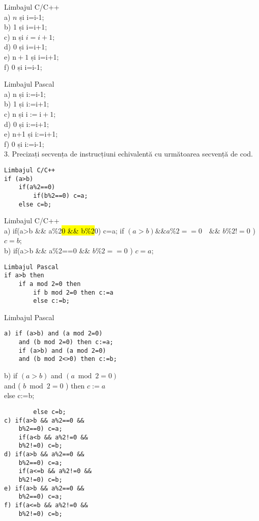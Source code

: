Limbajul C/C++\\
a) $n$ și i=i-1;\\
b) 1 și i=i+1;\\
c) n și $i=i+1$;\\
d) 0 și i=i+1;\\
e) $\mathrm{n}+1$ și i=i+1;\\
f) 0 și i=i-1;

Limbajul Pascal\\
a) n și i:=i-1;\\
b) 1 și i:=i+1;\\
c) n și $\mathrm{i}:=\mathrm{i}+1$;\\
d) 0 și i:=i+1;\\
e) n+1 și i:=i+1;\\
f) 0 și i:=i-1;\\
3. Precizați secvența de instrucțiuni echivalentă cu următoarea secvență de cod.

\begin{verbatim}
Limbajul C/C++
if (a>b)
    if(a%2==0)
        if(b%2==0) c=a;
    else c=b;
\end{verbatim}

Limbajul C/C++\\
a) if(a>b \&\& a\%2\hl{0 \&\& b\%2}0) c=a; if $(a>b) \& \& a \% 2==0 \quad \& \&$ $b \% 2!=0$ ) $c=b$;\\
b) if(a>b \&\& a\%2==0 \&\& $b \% 2==0$ ) $c=a$;

\begin{verbatim}
Limbajul Pascal
if a>b then
    if a mod 2=0 then
        if b mod 2=0 then c:=a
        else c:=b;
\end{verbatim}

Limbajul Pascal

\begin{verbatim}
a) if (a>b) and (a mod 2=0)
    and (b mod 2=0) then c:=a;
    if (a>b) and (a mod 2=0)
    and (b mod 2<>0) then c:=b;
\end{verbatim}

b) if $(a>b)$ and $(a \bmod 2=0)$\\
and ( $b \bmod 2=0$ ) then $c:=a$\\
else c:=b;

\begin{verbatim}
        else c=b;
c) if(a>b && a%2==0 &&
    b%2==0) c=a;
    if(a<b && a%2!=0 &&
    b%2!=0) c=b;
d) if(a>b && a%2==0 &&
    b%2==0) c=a;
    if(a<=b && a%2!=0 &&
    b%2!=0) c=b;
e) if(a>b && a%2==0 &&
    b%2==0) c=a;
f) if(a<=b && a%2!=0 &&
    b%2!=0) c=b;
\end{verbatim}

